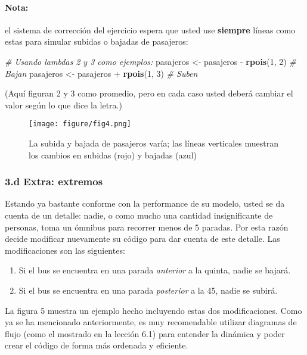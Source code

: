 \documentclass[]{article}
\makeatletter
\newenvironment{Shaded}{}{}
\newcommand{\KeywordTok}[1]{\textcolor[rgb]{0.00,0.44,0.13}{\textbf{{#1}}}}
\newcommand{\DecValTok}[1]{\textcolor[rgb]{0.25,0.63,0.44}{{#1}}}
\newcommand{\CommentTok}[1]{\textcolor[rgb]{0.38,0.63,0.69}{\textit{{#1}}}}
\newcommand{\NormalTok}[1]{{#1}}
\def\maxwidth{\ifdim\Gin@nat@width>\linewidth\linewidth
\else\Gin@nat@width\fi}
\let\Oldincludegraphics\includegraphics
\renewcommand{\includegraphics}[1]{\Oldincludegraphics[width=\maxwidth]{#1}}
\makeatother
\begin{document}
\paragraph{Nota:}

el sistema de corrección del ejercicio espera que usted use
\textbf{siempre} líneas como estas para simular subidas o bajadas de
pasajeros:

\begin{Shaded}
\begin{Highlighting}[]
\CommentTok{# Usando lambdas 2 y 3 como ejemplos:}
\NormalTok{pasajeros <- pasajeros - }\KeywordTok{rpois}\NormalTok{(}\DecValTok{1}\NormalTok{, }\DecValTok{2}\NormalTok{)  }\CommentTok{# Bajan}
\NormalTok{pasajeros <- pasajeros + }\KeywordTok{rpois}\NormalTok{(}\DecValTok{1}\NormalTok{, }\DecValTok{3}\NormalTok{)  }\CommentTok{# Suben}
\end{Highlighting}
\end{Shaded}
(Aquí figuran 2 y 3 como promedio, pero en cada caso usted deberá
cambiar el valor según lo que dice la letra.)

\begin{figure}[htbp]
\centering
\texttt{[image: figure/fig4.png]}
\caption{La subida y bajada de pasajeros varía; las líneas verticales
muestran los cambios en subidas (rojo) y bajadas (azul)}
\end{figure}

\subsubsection{3.d Extra: extremos}

Estando ya bastante conforme con la performance de su modelo, usted se
da cuenta de un detalle: nadie, o como mucho una cantidad insignificante
de personas, toma un ómnibus para recorrer menos de 5 paradas. Por esta
razón decide modificar nuevamente su código para dar cuenta de este
detalle. Las modificaciones son las siguientes:

\begin{enumerate}[1.]
\item
  Si el bus se encuentra en una parada \emph{anterior} a la quinta,
  nadie se bajará.
\item
  Si el bus se encuentra en una parada \emph{posterior} a la 45, nadie
  se subirá.
\end{enumerate}
La figura 5 muestra un ejemplo hecho incluyendo estas dos
modificaciones. Como ya se ha mencionado anteriormente, es muy
recomendable utilizar diagramas de flujo (como el mostrado en la lección
6.1) para entender la dinámica y poder crear el código de forma más
ordenada y eficiente.
\end{document}
